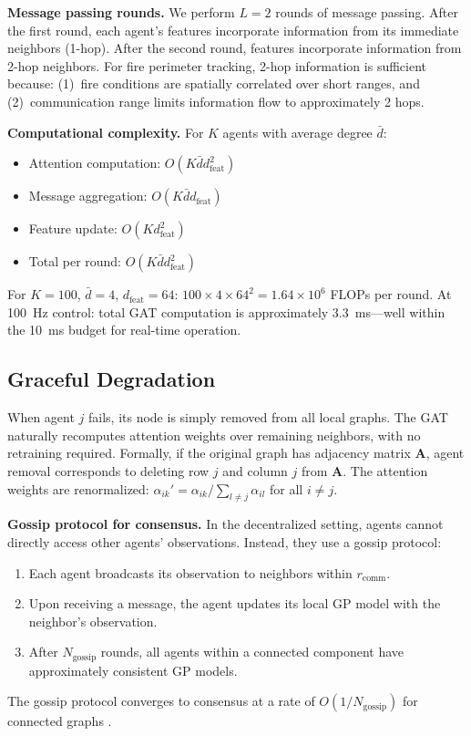 \documentclass[12pt,a4paper]{article}
\DeclareRobustCommand{\mat}[1]{\bm{#1}}
\begin{document}
\textbf{Message passing rounds.} We perform $L = 2$ rounds of message passing. After the first round, each agent's features incorporate information from its immediate neighbors (1-hop). After the second round, features incorporate information from 2-hop neighbors. For fire perimeter tracking, 2-hop information is sufficient because: (1)~fire conditions are spatially correlated over short ranges, and (2)~communication range limits information flow to approximately 2 hops.

\textbf{Computational complexity.} For $K$ agents with average degree $\bar{d}$:
\begin{itemize}[leftmargin=*]
    \item Attention computation: $O(K \bar{d} d_{\text{feat}}^2)$
    \item Message aggregation: $O(K \bar{d} d_{\text{feat}})$
    \item Feature update: $O(K d_{\text{feat}}^2)$
    \item Total per round: $O(K \bar{d} d_{\text{feat}}^2)$
\end{itemize}
For $K = 100$, $\bar{d} = 4$, $d_{\text{feat}} = 64$: $100 \times 4 \times 64^2 = 1.64 \times 10^6$ FLOPs per round. At 100~Hz control: total GAT computation is approximately 3.3~ms---well within the 10~ms budget for real-time operation.

\subsection{Graceful Degradation}
When agent $j$ fails, its node is simply removed from all local graphs. The GAT naturally recomputes attention weights over remaining neighbors, with no retraining required. Formally, if the original graph has adjacency matrix $\mat{A}$, agent removal corresponds to deleting row $j$ and column $j$ from $\mat{A}$. The attention weights are renormalized: $\alpha_{ik}' = \alpha_{ik} / \sum_{l \neq j} \alpha_{il}$ for all $i \neq j$.

\textbf{Gossip protocol for consensus.} In the decentralized setting, agents cannot directly access other agents' observations. Instead, they use a gossip protocol:
\begin{enumerate}[leftmargin=*]
    \item Each agent broadcasts its observation to neighbors within $r_{\text{comm}}$.
    \item Upon receiving a message, the agent updates its local GP model with the neighbor's observation.
    \item After $N_{\text{gossip}}$ rounds, all agents within a connected component have approximately consistent GP models.
\end{enumerate}
The gossip protocol converges to consensus at a rate of $O(1/N_{\text{gossip}})$ for connected graphs \cite{Ioannou2012}.
\end{document}

